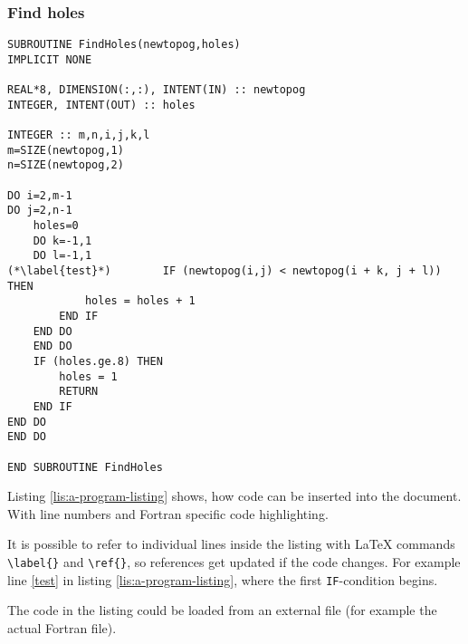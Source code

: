 

\begin{usessubs}
\end{usessubs}

\subsubsection{Find holes}



\begin{lstlisting}[caption={a program listing could look like this;
notice the language sensitive formatting},label={lis:a-program-listing},breaklines=true,tabsize=4]
SUBROUTINE FindHoles(newtopog,holes) 
IMPLICIT NONE

REAL*8, DIMENSION(:,:), INTENT(IN) :: newtopog 
INTEGER, INTENT(OUT) :: holes

INTEGER :: m,n,i,j,k,l 
m=SIZE(newtopog,1) 
n=SIZE(newtopog,2)

DO i=2,m-1 
DO j=2,n-1   
    holes=0   
	DO k=-1,1   
	DO l=-1,1     
(*\label{test}*)		IF (newtopog(i,j) < newtopog(i + k, j + l)) THEN
	    	holes = holes + 1     
		END IF   
	END DO   
	END DO   
	IF (holes.ge.8) THEN     
		holes = 1     
		RETURN   
	END IF 
END DO 
END DO

END SUBROUTINE FindHoles
\end{lstlisting}


Listing \ref{lis:a-program-listing} shows, how code can be inserted
into the document. With line numbers and Fortran specific code highlighting. 

It is possible to refer to individual lines inside the listing with
\LaTeX{} commands \texttt{\textbackslash{}label\{\}} and \texttt{\textbackslash{}ref\{\}},
so references get updated if the code changes. For example line \ref{test}
in listing \ref{lis:a-program-listing}, where the first \texttt{IF}-condition
begins.

The code in the listing could be loaded from an external file (for
example the actual Fortran file). 


